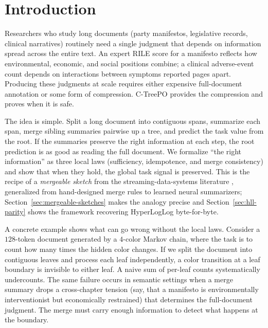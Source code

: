 \section{Introduction}\label{sec:introduction}

Researchers who study long documents (party manifestos, legislative records, clinical narratives) routinely need a single judgment that depends on information spread across the entire text. An expert RILE score for a manifesto reflects how environmental, economic, and social positions combine; a clinical adverse-event count depends on interactions between symptoms reported pages apart. Producing these judgments at scale requires either expensive full-document annotation or some form of compression. C-TreePO provides the compression and proves when it is safe.

The idea is simple. Split a long document into contiguous spans, summarize each span, merge sibling summaries pairwise up a tree, and predict the task value from the root. If the summaries preserve the right information at each step, the root prediction is as good as reading the full document. We formalize ``the right information'' as three local laws (sufficiency, idempotence, and merge consistency) and show that when they hold, the global task signal is preserved. This is the recipe of a \emph{mergeable sketch} from the streaming-data-systems literature \citep{Agarwal2013MergeableTODS}, generalized from hand-designed merge rules to learned neural summarizers; Section~\ref{sec:mergeable-sketches} makes the analogy precise and Section~\ref{sec:hll-parity} shows the framework recovering HyperLogLog byte-for-byte.

A concrete example shows what can go wrong without the local laws. Consider a $128$-token document generated by a $4$-color Markov chain, where the task is to count how many times the hidden color changes. If we split the document into contiguous leaves and process each leaf independently, a color transition at a leaf boundary is invisible to either leaf. A naive sum of per-leaf counts systematically undercounts. The same failure occurs in semantic settings when a merge summary drops a cross-chapter tension (say, that a manifesto is environmentally interventionist but economically restrained) that determines the full-document judgment. The merge must carry enough information to detect what happens at the boundary.

